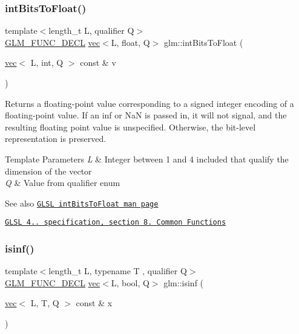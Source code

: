 \subsubsection{\texorpdfstring{int\+Bits\+To\+Float()}{intBitsToFloat()}\hspace{0.1cm}{\footnotesize\ttfamily [2/2]}}
{\footnotesize\ttfamily template$<$length\+\_\+t L, qualifier Q$>$ \\
\hyperlink{setup_8hpp_ab2d052de21a70539923e9bcbf6e83a51}{G\+L\+M\+\_\+\+F\+U\+N\+C\+\_\+\+D\+E\+CL} \hyperlink{structglm_1_1vec}{vec}$<$L, float, Q$>$ glm\+::int\+Bits\+To\+Float (\begin{DoxyParamCaption}\item[{\hyperlink{structglm_1_1vec}{vec}$<$ L, int, Q $>$ const \&}]{v }\end{DoxyParamCaption})}

Returns a floating-\/point value corresponding to a signed integer encoding of a floating-\/point value. If an inf or NaN is passed in, it will not signal, and the resulting floating point value is unspecified. Otherwise, the bit-\/level representation is preserved.


\begin{DoxyTemplParams}{Template Parameters}
{\em L} & Integer between 1 and 4 included that qualify the dimension of the vector \\
\hline
{\em Q} & Value from qualifier enum\\
\hline
\end{DoxyTemplParams}
\begin{DoxySeeAlso}{See also}
\href{http://www.opengl.org/sdk/docs/manglsl/xhtml/intBitsToFloat.xml}{\tt G\+L\+SL int\+Bits\+To\+Float man page} 

\href{http://www.opengl.org/registry/doc/GLSLangSpec.4.20.8.pdf}{\tt G\+L\+SL 4.. specification, section 8. Common Functions} 
\end{DoxySeeAlso}
\mbox{\label{group__core__func__common_ga2885587c23a106301f20443896365b62}} 
\subsubsection{\texorpdfstring{isinf()}{isinf()}}
{\footnotesize\ttfamily template$<$length\+\_\+t L, typename T , qualifier Q$>$ \\
\hyperlink{setup_8hpp_ab2d052de21a70539923e9bcbf6e83a51}{G\+L\+M\+\_\+\+F\+U\+N\+C\+\_\+\+D\+E\+CL} \hyperlink{structglm_1_1vec}{vec}$<$L, bool, Q$>$ glm\+::isinf (\begin{DoxyParamCaption}\item[{\hyperlink{structglm_1_1vec}{vec}$<$ L, T, Q $>$ const \&}]{x }\end{DoxyParamCaption})}

